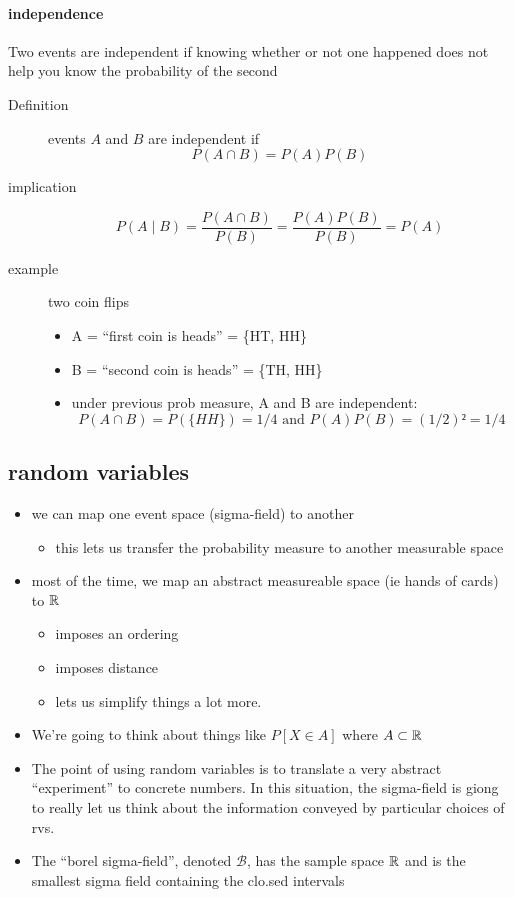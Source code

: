 \paragraph{independence}

      Two events are independent if knowing whether or not one
      happened does not help you know the probability of the second
\begin{description}
\item[Definition] events $A$ and $B$ are independent if \[P(A ∩
                      B) = P(A) P(B)\]
\item[implication] \[P(A ∣ B) = \frac{P(A ∩ B)}{P(B)} =
                       \frac{P(A) P(B)}{P(B)} = P(A)\]
\item[example] two coin flips
\begin{itemize}
\item A = ``first coin is heads'' = \{HT, HH\}
\item B = ``second coin is heads'' = \{TH, HH\}
\item under previous prob measure, A and B are independent: \[P(A
          ∩ B) = P(\{HH\}) = 1/4 \text{ and } P(A)P(B) = (1/2)² = 1/4\]
\end{itemize}
\end{description}

\subsection{random variables}

\begin{itemize}
\item we can map one event space (sigma-field) to another
\begin{itemize}
\item this lets us transfer the probability measure to another
        measurable space
\end{itemize}
\item most of the time, we map an abstract measureable space (ie hands
      of cards) to $\mathbb{R}$
\begin{itemize}
\item imposes an ordering
\item imposes distance
\item lets us simplify things a lot more.
\end{itemize}
\item We're going to think about things like $P[X ∈ A]$ where $A
      \subset \mathbb{R}$
\item The point of using random variables is to translate a very
      abstract ``experiment'' to concrete numbers.  In this situation,
      the sigma-field is giong to really let us think about the
      information conveyed by particular choices of rvs.
\item The ``borel sigma-field'', denoted $\mathcal B$, has the sample
      space $\mathbb{R}$ and is the smallest sigma field containing the
      clo.sed intervals
\end{itemize}

